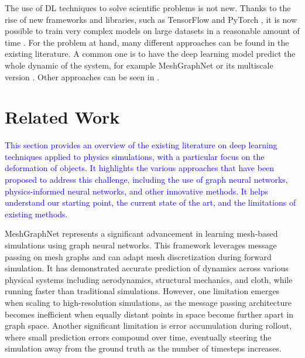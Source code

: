 The use of DL techniques to solve scientific problems is not new. Thanks to the rise of new frameworks and libraries, such as TensorFlow \cite{tensorflow2015-whitepaper} and PyTorch \cite{paszke2019pytorchimperativestylehighperformance}, it is now possible to train very complex models on large datasets in a reasonable amount of time \cite{tensorflow2015-whitepaper,paszke2019pytorchimperativestylehighperformance}. For the problem at hand, many different approaches can be found in the existing literature. A common one is to have the deep learning model predict the whole dynamic of the system, for example MeshGraphNet \cite{pfaffLearningMeshBasedSimulation2021a} or its multiscale version \cite{fortunatoMultiScaleMeshGraphNets2022}. Other approaches can be seen in \cite{jiangMeshfreeFlowNetPhysicsConstrainedDeep2020, hanPredictingPhysicsMeshreduced2022a}. 

\section*{Related Work}

\textcolor{blue}{This section provides an overview of the existing literature on deep learning techniques applied to physics simulations, with a particular focus on the deformation of objects. It highlights the various approaches that have been proposed to address this challenge, including the use of graph neural networks, physics-informed neural networks, and other innovative methods. It helps understand our starting point, the current state of the art, and the limitations of existing methods.}

MeshGraphNet \cite{pfaffLearningMeshBasedSimulation2021a} represents a significant advancement in learning mesh-based simulations using graph neural networks. This framework leverages message passing on mesh graphs and can adapt mesh discretization during forward simulation. It has demonstrated accurate prediction of dynamics across various physical systems including aerodynamics, structural mechanics, and cloth, while running faster than traditional simulations. However, one limitation emerges when scaling to high-resolution simulations, as the message passing architecture becomes inefficient when equally distant points in space become further apart in graph space. Another significant limitation is error accumulation during rollout, where small prediction errors compound over time, eventually steering the simulation away from the ground truth as the number of timesteps increases.


